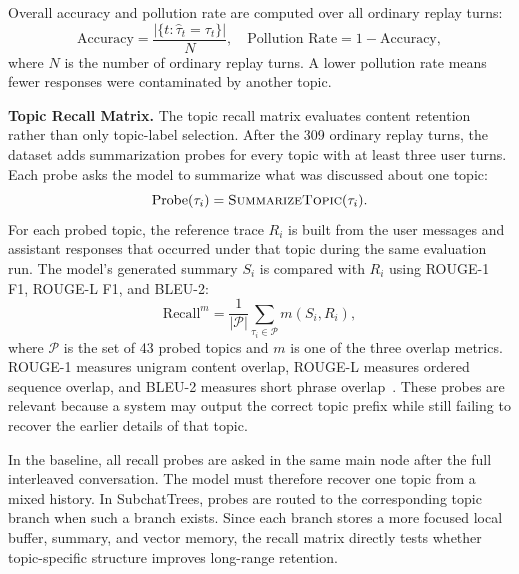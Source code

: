Overall accuracy and pollution rate are computed over all ordinary replay turns:
\begin{equation}
\text{Accuracy} = \frac{|\{t:\hat{\tau}_t=\tau_t\}|}{N}, \quad
\text{Pollution Rate} = 1-\text{Accuracy},
\label{eq:accuracy_pollution}
\end{equation}
where $N$ is the number of ordinary replay turns. A lower pollution rate means fewer responses were contaminated by another topic.

\textbf{Topic Recall Matrix.}
The topic recall matrix evaluates content retention rather than only topic-label selection. After the 309 ordinary replay turns, the dataset adds summarization probes for every topic with at least three user turns. Each probe asks the model to summarize what was discussed about one topic:
\begin{equation}
\operatorname{Probe}(\tau_i) = \textsc{SummarizeTopic}(\tau_i).
\label{eq:probe}
\end{equation}
For each probed topic, the reference trace $R_i$ is built from the user messages and assistant responses that occurred under that topic during the same evaluation run. The model's generated summary $S_i$ is compared with $R_i$ using ROUGE-1 F1, ROUGE-L F1, and BLEU-2:
\begin{equation}
\text{Recall}^{m} = \frac{1}{|\mathcal{P}|}\sum_{\tau_i \in \mathcal{P}} m(S_i, R_i),
\label{eq:recall_probe_agg}
\end{equation}
where $\mathcal{P}$ is the set of 43 probed topics and $m$ is one of the three overlap metrics. ROUGE-1 measures unigram content overlap, ROUGE-L measures ordered sequence overlap, and BLEU-2 measures short phrase overlap~\cite{lin2004rouge,papineni2002bleu}. These probes are relevant because a system may output the correct topic prefix while still failing to recover the earlier details of that topic.

In the baseline, all recall probes are asked in the same main node after the full interleaved conversation. The model must therefore recover one topic from a mixed history. In SubchatTrees, probes are routed to the corresponding topic branch when such a branch exists. Since each branch stores a more focused local buffer, summary, and vector memory, the recall matrix directly tests whether topic-specific structure improves long-range retention.

